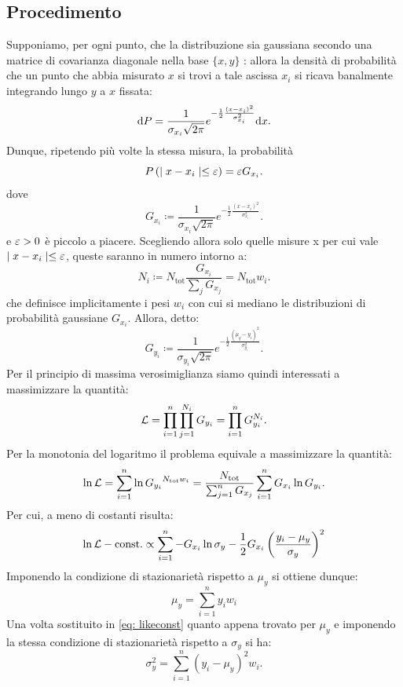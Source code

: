 \documentclass{article}[a4paper, oneside, 11pt]
\begin{document}
\subsection{Procedimento}
Supponiamo, per ogni punto, che la distribuzione sia gaussiana secondo una
matrice di covarianza diagonale nella base $\{x, y\}$ : allora la densità di
probabilità che un punto che abbia misurato $x$ si trovi a tale ascissa $x_i$
si ricava banalmente integrando lungo $y$ a $x$ fissata:
\[
	\mathrm{d} P = \frac{1}{\sigma_{x_i} \sqrt{2\pi}}
	e^{-\frac{1}{2}{\frac{(x - x_i)^2}{\sigma_{x_i}^2}}} \mathrm{d} x
.\] 
Dunque, ripetendo più volte la stessa misura, la probabilità
\[
	P\left( \mid x - x_i \mid  \leq \varepsilon  \right) = \varepsilon G_{x_i} 
.\]
dove \[
	G_{x_i} \coloneqq \frac{1}{\sigma_{x_i} \sqrt{2\pi}}
	e^{-\frac{1}{2}{\frac{(x - x_i)^2}{\sigma_{x_i}^2}}}
.\] 
e $\varepsilon > 0$ è piccolo a piacere. Scegliendo allora solo quelle misure x per
cui vale $\mid x - x_i \mid \leq \varepsilon$, queste saranno in numero intorno a:
\[
	N_i \coloneqq N_{\text{tot}} \frac{G_{x_i}}{\sum_j G_{x_j}} =
		N_{\text{tot}} w_i
.\] 
che definisce implicitamente i pesi $w_i$ con cui si mediano le distribuzioni
di probabilità gaussiane $G_{x_i}$.
Allora, detto:
\[
	G_{y_i} \coloneqq \frac{1}{\sigma_{y_i} \sqrt{2\pi}}
	e^{-\frac{1}{2}{\frac{(\mu_y - y_i)^2}{\sigma_{y_i}^2}}}
.\] 
Per il principio di massima verosimiglianza siamo quindi interessati a
massimizzare la quantità:
\[
	\mathcal L = \prod_{i=1}^{n} \prod_{j=1}^{N_i} G_{y_i} = 
	\prod_{i=1}^{n} G_{y_i}^{N_i}
.\] 
Per la monotonia del logaritmo il problema equivale a massimizzare la quantità:
\[
	\ln{\mathcal L} = \sum_{i=1}^{n}\ln{G_{y_i}}^{N_{\text{tot}}w_i} = 
	\frac{N_{\text{tot}}} {\sum_{j=1}^{n} G_{x_j}} 
	\sum_{i=1}^{n} G_{x_i} \ln{G_{y_i}}
.\] 
Per cui, a meno di costanti risulta:
\begin{equation}\label{eq: likeconst}
	\ln{\mathcal L} - \text{const.} \propto \sum_{i=1}^{n} -G_{x_i} \ln{\sigma_y}
	- \frac{1}{2} G_{x_i} \left( \frac{y_i - \mu_y}{\sigma_y} \right)^2
\end{equation}
Imponendo la condizione di stazionarietà rispetto a $\mu_y$ si ottiene dunque:
\begin{equation}\label{eq: muy}
	\mu_y = \sum_{i=1}^{n} y_i w_i 
\end{equation} 
Una volta sostituito in \eqref{eq: likeconst} quanto appena trovato per $\mu_y$
e imponendo la stessa condizione di stazionarietà rispetto a $\sigma_y$ si ha:
\begin{equation}\label{eq: sigmay}
	\sigma_y^2 = \sum_{i=1}^{n} (y_i - \mu_y)^2 w_i .
\end{equation}
\end{document}
